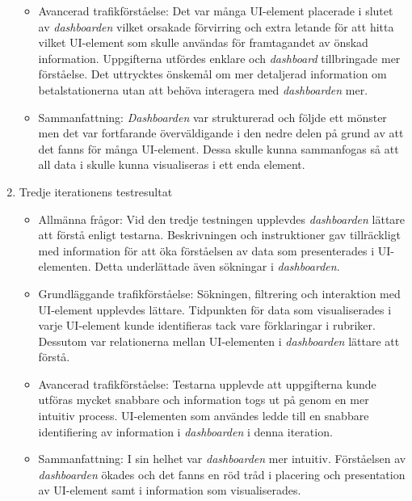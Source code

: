 \documentclass[12pt]{kththesis}
\begin{document}
\begin{enumerate}
\begin{itemize}
\item Avancerad trafikförståelse: Det var många UI-element placerade i slutet av \textit{dashboarden} vilket orsakade förvirring och extra letande för att hitta vilket UI-element som skulle användas för framtagandet av önskad information. Uppgifterna utfördes enklare och \textit{dashboard} tillbringade mer förståelse. Det uttrycktes önskemål om mer detaljerad information om betalstationerna utan att behöva interagera med \textit{dashboarden} mer.

\item Sammanfattning: \textit{Dashboarden} var strukturerad och följde ett mönster men det var fortfarande överväldigande i den nedre delen på grund av att det fanns för många UI-element. Dessa skulle kunna sammanfogas så att all data i skulle kunna visualiseras i ett enda element.
\end{itemize}

\item Tredje iterationens testresultat 

\begin{itemize}
\item Allmänna frågor: Vid den tredje testningen upplevdes \textit{dashboarden} lättare att förstå enligt testarna. Beskrivningen och instruktioner gav tillräckligt med information för att öka förståelsen av data som presenterades i UI-elementen. Detta underlättade även sökningar i \textit{dashboarden}. 

\item   Grundläggande trafikförståelse: Sökningen, filtrering och interaktion med UI-element upplevdes lättare. Tidpunkten för data som visualiserades i varje UI-element kunde identifieras tack vare förklaringar i rubriker. Dessutom var relationerna mellan UI-elementen i \textit{dashboarden} lättare att förstå.

\item Avancerad trafikförståelse: Testarna upplevde att uppgifterna kunde utföras mycket snabbare och information togs ut på genom en mer intuitiv process. UI-elementen som användes ledde till en snabbare identifiering av information i \textit{dashboarden} i denna iteration. 

\item Sammanfattning: I sin helhet var \textit{dashboarden} mer intuitiv. Förståelsen av \textit{dashboarden} ökades och det fanns en röd tråd i placering och presentation av UI-element samt i information som visualiserades. 
\end{itemize}
\end{enumerate}
\end{document}
